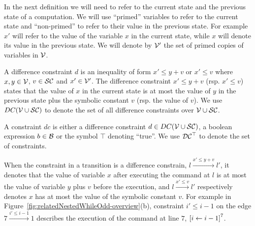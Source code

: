 In the next definition we will need to refer to the current state and the previous state of a computation. We will use ``primed'' variables  to refer to the current state and ``non-primed'' to refer to their value in the previous state. For example $x'$ will refer to the value of the variable $x$ in the current state, while $x$ will denote its value in the previous state. We will denote by $\mathcal{V}'$ the set of primed copies of variables in $\mathcal{V}$.
\begin{defn}
A difference constraint $d$ is an inequality of
form $x' \leq y + v$ or $x' \leq v$ where $x, y \in \mathcal{V} $, $v \in \mathcal{SC}$ and $x' \in \mathcal{V}'$. The difference constraint
$x' \leq y + v$ (rsp. $x' \leq v$) states that the value of $x$ in the current state is
at most the value of $y$ in the previous state plus the symbolic constant $v$ (rsp. the value of $v$).
We use $DC(\mathcal{V} \cup \mathcal{SC})$ to denote the set of all difference constraints over $\mathcal{V} \cup \mathcal{SC}$.
\end{defn}


\begin{defn}[Constraints]
A constraint $dc$
is either a
difference constraint $d \in DC(\mathcal{V} \cup \mathcal{SC})$, a boolean expression $b \in \mathcal{B}$
or the symbol $\top$ denoting ``true''. We use $\mathcal{DC}^{\top}$ to denote the set of constraints. 
\end{defn}

When the constraint in a transition is a difference constrain, $l \xrightarrow{x' \leq y + v} l'$,
it denotes that
the value of variable $x$
after executing the command at $l$ is at most
the value of variable $y$ plus $v$ before the execution,
and $l \xrightarrow{x' \leq v} l'$ respectively denotes
$x$ has at most
the value of the symbolic constant $v$.
For example in Figure~\ref{fig:relatedNestedWhileOdd-overview}(b), constraint $i' \leq i - 1$ on the edge $7 \xrightarrow{i' \leq i - 1} 1$
describes the execution of
 the command at line $7$, 
$\clabel{\assign{i}{i - 1}}^{7}$. 


